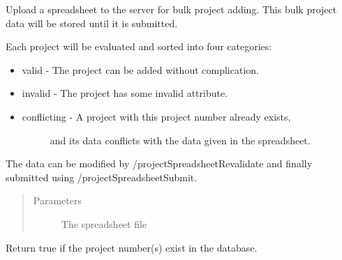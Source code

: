 \documentclass[letterpaper,10pt,english]{sphinxmanual}
\begin{document}
\begin{fulllineitems}
\begin{fulllineitems}
\label{\detokenize{apidoc/utdesign_procurement:utdesign_procurement.apigateway.ApiGateway.projectSpreadsheetUpload}}
Upload a spreadsheet to the server for bulk project adding. This bulk
project data will be stored until it is submitted.

Each project will be evaluated and sorted into four categories:
\begin{itemize}
\item {} 
valid - The project can be added without complication.

\item {} 
invalid - The project has some invalid attribute.

\item {} \begin{description}
\item[{conflicting - A project with this project number already exists,}] \leavevmode
and its data conflicts with the data given in the spreadsheet.

\end{description}

\end{itemize}

The data can be modified by /projectSpreadsheetRevalidate and finally
submitted using /projectSpreadsheetSubmit.
\begin{quote}\begin{description}
\item[{Parameters}] \leavevmode
{} \textendash{} The spreadsheet file

\end{description}\end{quote}

\end{fulllineitems}


\begin{fulllineitems}
\label{\detokenize{apidoc/utdesign_procurement:utdesign_procurement.apigateway.ApiGateway.projectValidate}}
Return true if the project number(s) exist in the database.


\end{fulllineitems}
\end{fulllineitems}
\end{document}
